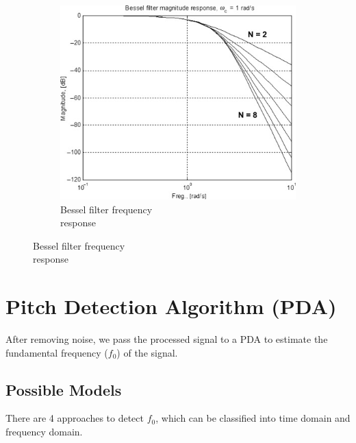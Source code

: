 \begin{figure}[h]
\begin{subfigure}{.4\textwidth}
		\includegraphics[width=1\linewidth]{Figures/bessel.jpg}
		\caption{Bessel filter frequency\\response}
		\label{fig:sub3}
	\end{subfigure}

\end{figure}

\section{Pitch Detection Algorithm (PDA)}
\label{sec:PDA}
After removing noise, we pass the processed signal to a PDA to estimate the fundamental frequency ($f_0$) of
the signal.

\subsection{Possible Models}
There are 4 approaches to detect $f_0$, which can be classified into time domain and frequency domain.


